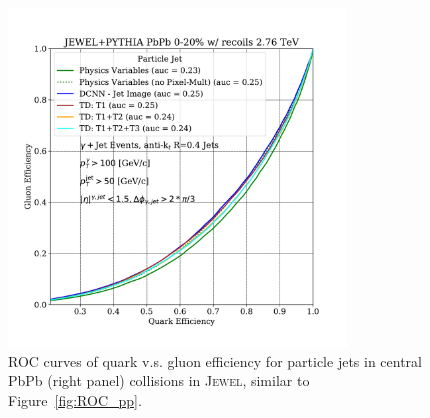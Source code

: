 \documentclass[notoc,preprintnumbers]{JHEP3}
\begin{document}
\begin{figure}[h]
	\centering
	\includegraphics[width=0.8\textwidth]{Fig14}
	\caption{ROC curves of quark v.s. gluon efficiency for particle jets in central PbPb (right panel) collisions in \textsc{Jewel}, similar to Figure~\ref{fig:ROC_pp}.}
\label{fig:ROC_pbpb}
\end{figure}
\end{document}
